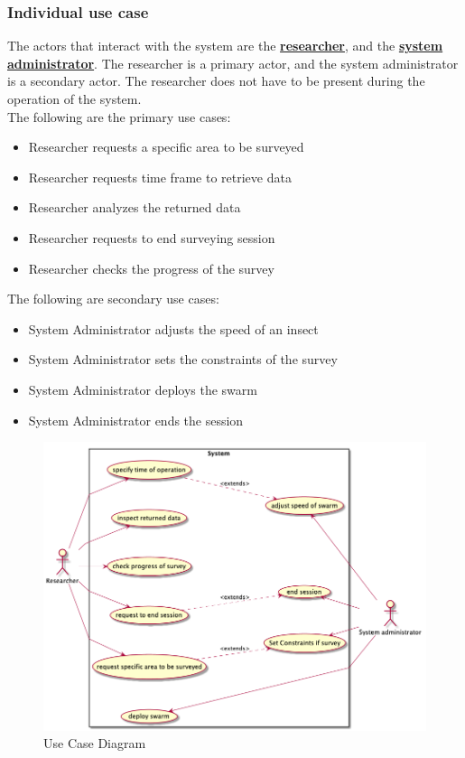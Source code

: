 \documentclass[11pt]{article}
\begin{document}
\subsubsection{Individual use case}
The actors that interact with the system are the \textbf{\hyperref[sec:definitions]{researcher}}, and the \textbf{\hyperref[sec:definitions]{system administrator}}. The researcher is a primary actor, and the system administrator is a secondary actor. The researcher does not have to be present during the operation of the system. \\
The following are the primary use cases:
\begin{itemize}
    \item Researcher requests a specific area to be surveyed
    \item Researcher requests time frame to retrieve data
    \item Researcher analyzes the returned data
    \item  Researcher requests to end surveying session
    \item Researcher checks the progress of the survey
\end{itemize}
The following are secondary use cases:
\begin{itemize}
    \item System Administrator adjusts the speed of an insect
    \item System Administrator sets the constraints of the survey
    \item System Administrator deploys the swarm
    \item System Administrator ends the session
\end{itemize}
\begin{figure}[H]
   \centering
   \includegraphics[width=\textwidth]{diagrams/usecase.png}
   \caption{Use Case Diagram}
   \label{fig:ucd}
\end{figure}
\end{document}
